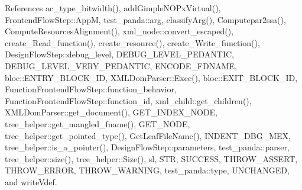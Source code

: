 References ac\+\_\+type\+\_\+bitwidth(), add\+Gimple\+N\+O\+Px\+Virtual(), Frontend\+Flow\+Step\+::\+AppM, test\+\_\+panda\+::arg, classify\+Arg(), Computepar2ssa(), Compute\+Resources\+Alignment(), xml\+\_\+node\+::convert\+\_\+escaped(), create\+\_\+\+Read\+\_\+function(), create\+\_\+resource(), create\+\_\+\+Write\+\_\+function(), Design\+Flow\+Step\+::debug\+\_\+level, D\+E\+B\+U\+G\+\_\+\+L\+E\+V\+E\+L\+\_\+\+P\+E\+D\+A\+N\+T\+IC, D\+E\+B\+U\+G\+\_\+\+L\+E\+V\+E\+L\+\_\+\+V\+E\+R\+Y\+\_\+\+P\+E\+D\+A\+N\+T\+IC, E\+N\+C\+O\+D\+E\+\_\+\+F\+D\+N\+A\+ME, bloc\+::\+E\+N\+T\+R\+Y\+\_\+\+B\+L\+O\+C\+K\+\_\+\+ID, X\+M\+L\+Dom\+Parser\+::\+Exec(), bloc\+::\+E\+X\+I\+T\+\_\+\+B\+L\+O\+C\+K\+\_\+\+ID, Function\+Frontend\+Flow\+Step\+::function\+\_\+behavior, Function\+Frontend\+Flow\+Step\+::function\+\_\+id, xml\+\_\+child\+::get\+\_\+children(), X\+M\+L\+Dom\+Parser\+::get\+\_\+document(), G\+E\+T\+\_\+\+I\+N\+D\+E\+X\+\_\+\+N\+O\+DE, tree\+\_\+helper\+::get\+\_\+mangled\+\_\+fname(), G\+E\+T\+\_\+\+N\+O\+DE, tree\+\_\+helper\+::get\+\_\+pointed\+\_\+type(), Get\+Leaf\+File\+Name(), I\+N\+D\+E\+N\+T\+\_\+\+D\+B\+G\+\_\+\+M\+EX, tree\+\_\+helper\+::is\+\_\+a\+\_\+pointer(), Design\+Flow\+Step\+::parameters, test\+\_\+panda\+::parser, tree\+\_\+helper\+::size(), tree\+\_\+helper\+::\+Size(), sl, S\+TR, S\+U\+C\+C\+E\+SS, T\+H\+R\+O\+W\+\_\+\+A\+S\+S\+E\+RT, T\+H\+R\+O\+W\+\_\+\+E\+R\+R\+OR, T\+H\+R\+O\+W\+\_\+\+W\+A\+R\+N\+I\+NG, test\+\_\+panda\+::type, U\+N\+C\+H\+A\+N\+G\+ED, and write\+Vdef.

